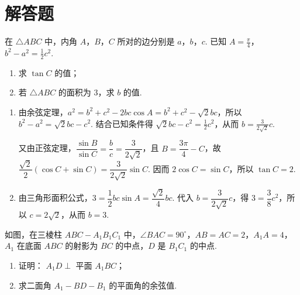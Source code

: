 \section{解答题}

\begin{problem}
在 \(\triangle ABC\) 中，内角 \(A\)，\(B\)，\(C\) 所对的边分别是 \(a\)，\(b\)，\(c\). 已知 \(A = \frac{\pi}{4}\)，\(b^2 - a^2 = \frac{1}{2} c^2\).
\begin{enumerate}
\item 求 \(\tan C\) 的值；
\item 若 \(\triangle ABC\) 的面积为 3，求 \(b\) 的值.
\end{enumerate}
\end{problem}

\begin{solution}
\begin{enumerate}
\item 由余弦定理，\(a^2=b^2+c^2-2bc\cos A=b^2+c^2-\sqrt{2}bc\)，所以
\(b^2-a^2=\sqrt{2}bc-c^2\). 结合已知条件得
\(\sqrt{2}bc-c^2=\frac{1}{2}c^2\)，从而 \(b=\frac{3}{2\sqrt{2}}c\).

又由正弦定理，\(\dfrac{\sin B}{\sin C}=\dfrac{b}{c}=\dfrac{3}{2\sqrt{2}}\)，且 \(B=\dfrac{3\pi}{4}-C\)，故
\(\dfrac{\sqrt{2}}{2}(\cos C+\sin C)=\dfrac{3}{2\sqrt{2}}\sin C\). 因而 \(2\cos C=\sin C\)，所以 \(\tan C=2\).

\item 由三角形面积公式，\(3=\dfrac{1}{2}bc\sin A=\dfrac{\sqrt{2}}{4}bc\). 代入 \(b=\dfrac{3}{2\sqrt{2}}c\)，得 \(3=\dfrac{3}{8}c^2\)，所以 \(c=2\sqrt{2}\)，从而 \(b=3\).
\end{enumerate}
\end{solution}

\begin{problem}
如图，在三棱柱 \(ABC - A_{1}B_{1}C_{1}\) 中，\(\angle BAC = 90^{\circ}\)，\(AB = AC = 2\)，\(A_{1}A = 4\)，\(A_{1}\) 在底面 \(ABC\) 的射影为 \(BC\) 的中点，\(D\) 是 \(B_{1}C_{1}\) 的中点.
\begin{enumerate}
\item 证明： \(A_{1}D \perp\) 平面 \(A_{1}BC\)；
\item 求二面角 \(A_{1} - BD - B_{1}\) 的平面角的余弦值.
\end{enumerate}

\end{problem}

